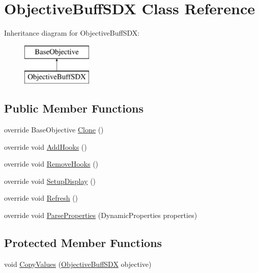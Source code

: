 \hypertarget{class_objective_buff_s_d_x}{}\section{Objective\+Buff\+S\+DX Class Reference}
\label{class_objective_buff_s_d_x}
Inheritance diagram for Objective\+Buff\+S\+DX\+:\begin{figure}[H]
\begin{center}
\leavevmode
\includegraphics[height=2.000000cm]{d1/d4c/class_objective_buff_s_d_x}
\end{center}
\end{figure}
\subsection*{Public Member Functions}
\begin{DoxyCompactItemize}
\item 
override Base\+Objective \mbox{\hyperlink{class_objective_buff_s_d_x_ad722c8d6d2f1ff2c93392db99b36898d}{Clone}} ()
\item 
override void \mbox{\hyperlink{class_objective_buff_s_d_x_a480d6da50219905d2c13185bfa612bc5}{Add\+Hooks}} ()
\item 
override void \mbox{\hyperlink{class_objective_buff_s_d_x_a279a2332ce0ee68a1039d5f07b9d68a7}{Remove\+Hooks}} ()
\item 
override void \mbox{\hyperlink{class_objective_buff_s_d_x_ad43a50ad5cd6ef6d839c824cb8005790}{Setup\+Display}} ()
\item 
override void \mbox{\hyperlink{class_objective_buff_s_d_x_adf0204ccd2aae5c18ab512c24b1681ec}{Refresh}} ()
\item 
override void \mbox{\hyperlink{class_objective_buff_s_d_x_ac7613fa46712ddfa0c7c4c4b848eca08}{Parse\+Properties}} (Dynamic\+Properties properties)
\end{DoxyCompactItemize}
\subsection*{Protected Member Functions}
\begin{DoxyCompactItemize}
\item 
void \mbox{\hyperlink{class_objective_buff_s_d_x_ae751ff717d73f70e38fd95b907bc9949}{Copy\+Values}} (\mbox{\hyperlink{class_objective_buff_s_d_x}{Objective\+Buff\+S\+DX}} objective)
\end{DoxyCompactItemize}
